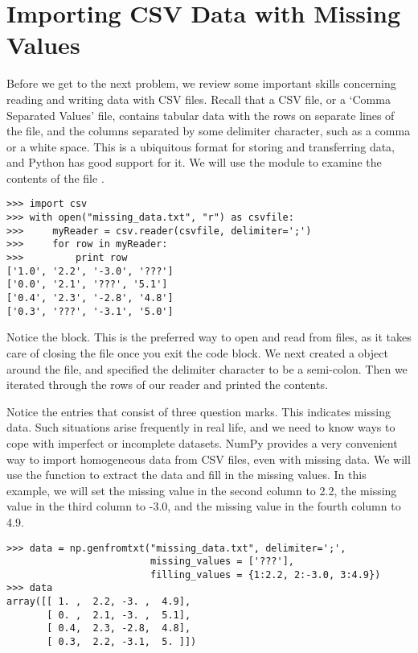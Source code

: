 \section*{Importing CSV Data with Missing Values}
Before we get to the next problem, we review some important skills concerning reading and writing data with CSV files.
Recall that a CSV file, or a `Comma Separated Values' file, contains tabular data with the rows on separate lines
of the file, and the columns separated by some delimiter character, such as a comma or a white space. This is a
ubiquitous format for storing and transferring data, and Python has good support for it. We will use the 
module to examine the contents of the file .

\begin{lstlisting}
>>> import csv
>>> with open("missing_data.txt", "r") as csvfile:
>>>     myReader = csv.reader(csvfile, delimiter=';')
>>>     for row in myReader:
>>>         print row
['1.0', '2.2', '-3.0', '???']
['0.0', '2.1', '???', '5.1']
['0.4', '2.3', '-2.8', '4.8']
['0.3', '???', '-3.1', '5.0']
\end{lstlisting}

Notice the  block. This is the preferred way to open and read from files, as it takes care of
closing the file once you exit the code block. We next created a  object around
the file, and specified the delimiter character to be a semi-colon. Then we iterated through the rows of our reader
and printed the contents.

Notice the entries that consist of three question marks. This indicates missing data. Such situations arise frequently
in real life, and we need to know ways to cope with imperfect or incomplete datasets. NumPy provides a very convenient
way to import homogeneous data from CSV files, even with missing data. We will use the  function to
extract the data and fill in the missing values. In this example, we will set the missing value in the second column to
2.2, the missing value in the third column to -3.0, and the missing value in the fourth column to 4.9.

\begin{lstlisting}
>>> data = np.genfromtxt("missing_data.txt", delimiter=';',
                         missing_values = ['???'],
                         filling_values = {1:2.2, 2:-3.0, 3:4.9})
>>> data
array([[ 1. ,  2.2, -3. ,  4.9],
       [ 0. ,  2.1, -3. ,  5.1],
       [ 0.4,  2.3, -2.8,  4.8],
       [ 0.3,  2.2, -3.1,  5. ]])
\end{lstlisting}

